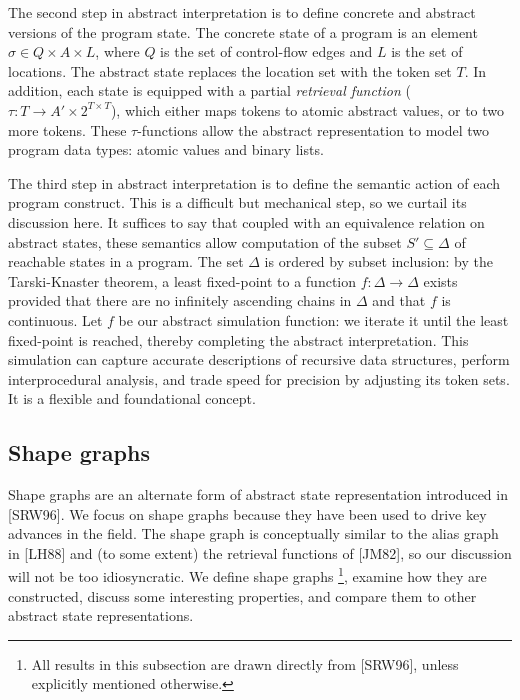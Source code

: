 \documentclass{article}
\begin{document}
The second step in abstract interpretation is to define concrete and
abstract versions of the program state.  The concrete state of a program is
an element $\sigma \in Q \times A \times L$, where $Q$ is the set of
control-flow edges and $L$ is the set of locations. The abstract state
replaces the location set with the token set $T$. In addition, each state is
equipped with a partial \textit{retrieval function} ($\tau : T \rightarrow
A' \times 2^{T \times T}$), which either maps tokens to atomic abstract
values, or to two more tokens. These $\tau$-functions allow the abstract
representation to model two program data types: atomic values and binary
lists.

The third step in abstract interpretation is to define the semantic action
of each program construct. This is a difficult but mechanical step, so we
curtail its discussion here. It suffices to say that coupled with an
equivalence relation on abstract states, these semantics allow computation
of the subset $S' \subseteq \Delta$ of reachable states in a program.  The
set $\Delta$ is ordered by subset inclusion: by the Tarski-Knaster theorem,
a least fixed-point to a function $f: \Delta \rightarrow \Delta$ exists
provided that there are no infinitely ascending chains in $\Delta$ and
that $f$ is continuous. Let $f$ be our abstract simulation function: we 
iterate it until the least fixed-point is reached, thereby completing the
abstract interpretation. This simulation can capture accurate descriptions
of recursive data structures, perform interprocedural analysis, and trade
speed for precision by adjusting its token sets. It is a flexible and
foundational concept.

\subsection{Shape graphs}

Shape graphs are an alternate form of abstract state representation
introduced in [SRW96]. We focus on shape graphs because they have been used
to drive key advances in the field. The shape graph is conceptually similar to
the alias graph in [LH88] and (to some extent) the retrieval functions of
[JM82], so our discussion will not be too idiosyncratic. We define shape
graphs \footnote{All results in this subsection are drawn directly from
[SRW96], unless explicitly mentioned otherwise.}, examine how they are
constructed, discuss some interesting properties, and compare them to other
abstract state representations.
\end{document}

